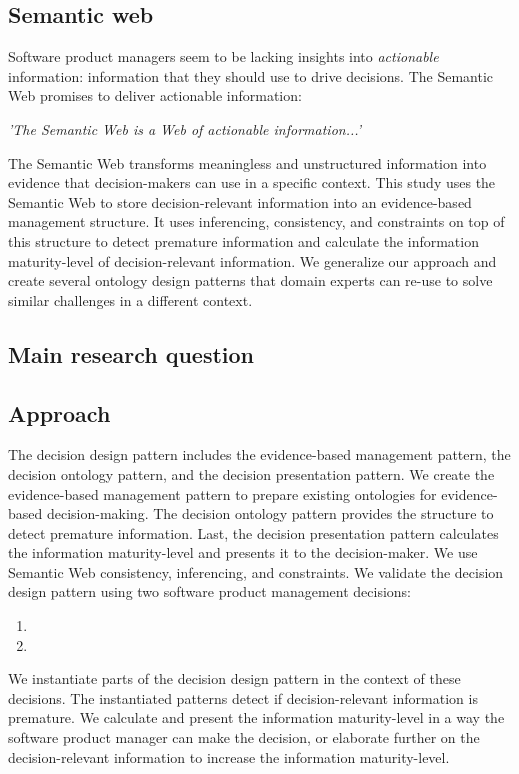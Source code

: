 \subsection{Semantic web}
Software product managers seem to be lacking insights into \emph{actionable} information: information that they should use to drive decisions. The Semantic Web promises to deliver actionable information:
\begin{quoting}\itshape
'The Semantic Web is a Web of actionable information...' \parencite{SM13}
\end{quoting}
The Semantic Web transforms meaningless and unstructured information into evidence that decision-makers can use in a specific context. This study uses the Semantic Web to store decision-relevant information into an evidence-based management structure. It uses inferencing, consistency, and constraints on top of this structure to detect premature information and calculate the information maturity-level of decision-relevant information. We generalize our approach and create several ontology design patterns that domain experts can re-use to solve similar challenges in a different context.

\subsection{Main research question}
\abstractkey

\begin{center}
\large\color{document}{\researchquestion}
\end{center}

\subsection{Approach}
The decision design pattern includes the evidence-based management pattern, the decision ontology pattern, and the decision presentation pattern. We create the evidence-based management pattern to prepare existing ontologies for evidence-based decision-making. The decision ontology pattern provides the structure to detect premature information. Last, the decision presentation pattern calculates the information maturity-level and presents it to the decision-maker. We use Semantic Web consistency, inferencing, and constraints. We validate the decision design pattern using two software product management decisions:
\begin{enumerate}
\item {}
\item {}
\end{enumerate}
We instantiate parts of the decision design pattern in the context of these decisions. The instantiated patterns detect if decision-relevant information is premature. We calculate and present the information maturity-level in a way the software product manager can make the decision, or elaborate further on the decision-relevant information to increase the information maturity-level.